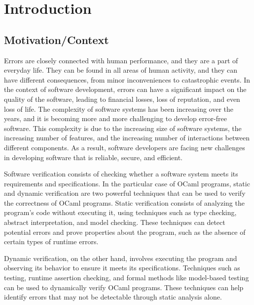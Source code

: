 
%

\chapter{Introduction}
\label{cha:introduction}

\section{Motivation/Context}
\label{sec:motivation_context}

Errors are closely connected with human performance, and they are a part of everyday life. 
They can be found in all areas of human activity, and they can have different consequences, 
from minor inconveniences to catastrophic events. In the context of software development, 
errors can have a significant impact on the quality of the software, leading to financial losses, 
loss of reputation, and even loss of life. The complexity of software systems has been increasing 
over the years, and it is becoming more and more challenging to develop error-free software. 
This complexity is due to the increasing size of software systems, the increasing number of features, 
and the increasing number of interactions between different components. As a result, software 
developers are facing new challenges in developing software that is reliable, secure, and efficient.

Software verification consists of checking whether a software system meets its requirements and
specifications. In the particular case of OCaml programs, static and dynamic verification are two powerful 
techniques that can be used to verify the correctness of OCaml programs. Static verification consists of 
analyzing the program's code without executing it, using techniques such as type checking, abstract 
interpretation, and model checking. These techniques can detect potential errors and prove properties 
about the program, such as the absence of certain types of runtime errors.

Dynamic verification, on the other hand, involves executing the program and observing its behavior 
to ensure it meets its specifications. Techniques such as testing, runtime assertion checking, and 
formal methods like model-based testing can be used to dynamically verify OCaml programs. 
These techniques can help identify errors that may not be detectable through static analysis alone.

